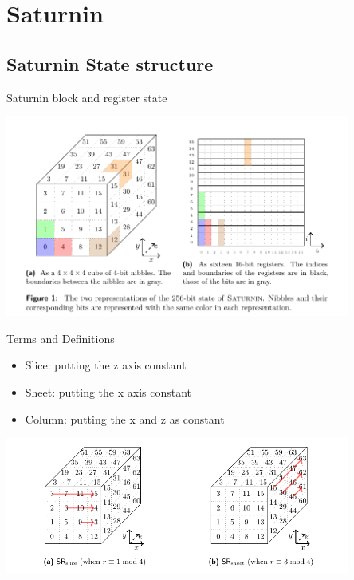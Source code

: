 \section{Saturnin}
\subsection{Saturnin State structure}

\begin{frame}{Saturnin block and register state}
    \begin{center}
        \includegraphics[width=0.85\textwidth,height=0.9\textheight,keepaspectratio]{Images/Figures/1.jpg}
    \end{center}

\end{frame}

\begin{frame}{Terms and Definitions}

\begin{itemize}
    \item Slice: putting the z axis constant
    \item Sheet: putting the x axis constant
    \item Column: putting the x and z as constant
\end{itemize}

\begin{center}
    \includegraphics[width=0.85\textwidth,height=0.9\textheight,keepaspectratio]{Images/Figures/2.png}
\end{center}
\end{frame}

